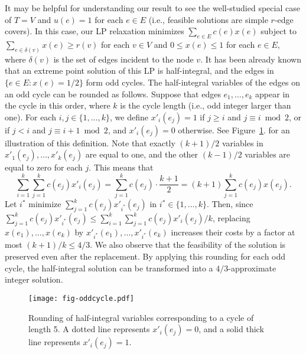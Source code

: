 \documentclass{article}
\begin{document}
It may be helpful for understanding our result to see the well-studied special case of $T=V$ 
and $u(e)=1$ for each $e \in E$ (i.e., feasible solutions are simple $r$-edge covers).
In this case, our LP relaxation minimizes $\sum_{e \in E} c(e)x(e)$ subject to 
$\sum_{e \in \delta(v)}x(e) \geq r(v)$ for each $v \in V$
and $0 \leq x(e) \leq 1$ for each $e \in E$, where $\delta(v)$ is the set of edges incident to the node $v$.
It has been already known that an extreme point solution of this LP 
is half-integral, and the edges in $\{e \in E \colon x(e)=1/2\}$ form odd cycles.
The half-integral variables of the edges on an odd cycle
can be rounded as follows. Suppose that edges $e_1,\ldots,e_k$ 
appear in the cycle in this order, where $k$ is the cycle length (i.e., odd integer larger than one).
For each $i,j \in \{1,\ldots,k\}$,
we define 
$x'_i(e_j)=1$
if $j \geq i$ and $j\equiv i \bmod 2$,
or if $j < i$ and $j\equiv i+1 \bmod 2$,
and 
$x'_i(e_j)=0$ otherwise.
See Figure~\ref{fig.oddcicle}.
for an illustration of this definition.
Note that exactly $(k+1)/2$ variables
in $x'_1(e_j),\ldots,x'_k(e_j)$ are equal to one,
and the other $(k-1)/2$ variables are equal to zero for each $j$.
This means that 
\[
\sum_{i=1}^k \sum_{j=1}^k c(e_j)x'_i(e_j)
= \sum_{j=1}^k c(e_j)\cdot \frac{k+1}{2}
=(k+1)\sum_{j=1}^k c(e_j)x(e_j).
\]
Let $i^*$ minimize $\sum_{j=1}^k c(e_j)x'_{i^*}(e_j)$ in $i^* \in \{1,\ldots,k\}$.
Then, since $\sum_{j=1}^k c(e_j)x'_{i^*}(e_j) \leq \sum_{i=1}^k \sum_{j=1}^k c(e_j)x'_i(e_j)/k$,
replacing $x(e_1),\ldots,x(e_k)$ by $x'_{i^*}(e_1),\ldots,x'_{i^*}(e_k)$
increases their costs by a factor at most $(k+1)/k \leq 4/3$.
We also observe that 
the feasibility of the solution is preserved
even after the replacement.
By applying this rounding for each odd cycle, the half-integral solution 
can be transformed into a $4/3$-approximate integer solution.

\begin{figure}[h]
\centering
\texttt{[image: fig-oddcycle.pdf]}
\caption{Rounding of half-integral variables corresponding to a cycle of length 5. 
A dotted line represents $x'_i(e_j)=0$, and a solid thick line represents $x'_i(e_j)=1$.}
\label{fig.oddcicle}
\end{figure}
\end{document}
